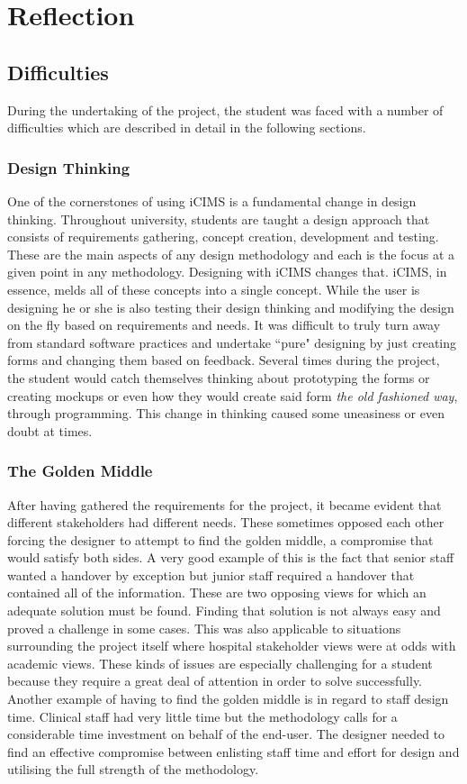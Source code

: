 \section{Reflection}

\subsection{Difficulties}
\label{Difficulties}
During the undertaking of the project, the student was faced with a number of difficulties which are described in detail in the following sections.

\subsubsection{Design Thinking}
One of the cornerstones of using iCIMS is a fundamental change in design thinking. Throughout university, students are taught a design approach that consists of requirements gathering, concept creation, development and testing. These are the main aspects of any design methodology and each is the focus at a given point in any methodology. Designing with iCIMS changes that. iCIMS, in essence, melds all of these concepts into a single concept. While the user is designing he or she is also testing their design thinking and modifying the design on the fly based on requirements and needs. It was difficult to truly turn away from standard software practices and undertake ``pure" designing by just creating forms and changing them based on feedback. Several times during the project, the student would catch themselves thinking about prototyping the forms or creating mockups or even how they would create said form \emph{the old fashioned way}, through programming. This change in thinking caused some uneasiness or even doubt at times. 

\subsubsection{The Golden Middle}
\label{The Golden Middle}
After having gathered the requirements for the project, it became evident that different stakeholders had different needs. These sometimes opposed each other forcing the designer to attempt to find the golden middle, a compromise that would satisfy both sides. A very good example of this is the fact that senior staff wanted a handover by exception but junior staff required a handover that contained all of the information. These are two opposing views for which an adequate solution must be found. Finding that solution is not always easy and proved a challenge in some cases. This was also applicable to situations surrounding the project itself where hospital stakeholder views were at odds with academic views. These kinds of issues are especially challenging for a student because they require  a great deal of attention in order to solve successfully. Another example of having to find the golden middle is in regard to staff design time. Clinical staff had very little time but the methodology calls for a considerable time investment on behalf of the end-user. The designer needed to find an effective compromise between enlisting staff time and effort for design and utilising the full strength of the methodology.

